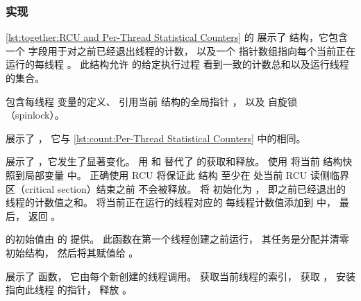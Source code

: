 \subsubsection{实现}

\begin{fcvref}
\cref{lst:together:RCU and Per-Thread Statistical Counters}
的 
展示了  结构，它包含一个
 字段用于对之前已经退出线程的计数，
以及一个  指针数组指向每个当前正在
运行的每线程 。
此结构允许  的给定执行过程
看到一致的计数总和以及运行线程的集合。

\begin{listing}
\caption{RCU 与每线程统计计数器}
\label{lst:together:RCU and Per-Thread Statistical Counters}
\end{listing}

包含每线程  变量的定义、
引用当前  结构的全局指针 ，
以及  自旋锁（spinlock）。

 展示了 ，
它与 \cref{lst:count:Per-Thread Statistical Counters} 中的相同。
\end{fcvref}

\begin{fcvref}
 展示了 ，它发生了显著变化。
 用  和
 替代了  的获取和释放。
 使用  将当前
 结构快照到局部变量  中。
正确使用 RCU 将保证此  结构
至少在  处当前 RCU 读侧临界区（critical section）结束之前
不会被释放。
 将  初始化为 ，
即之前已经退出的线程的计数值之和。
 将当前正在运行的线程对应的
每线程计数值添加到  中，
最后， 返回 。
\end{fcvref}

\begin{fcvref}
 的初始值由
 的  提供。
此函数在第一个线程创建之前运行，
其任务是分配并清零初始结构，
然后将其赋值给 。
\end{fcvref}

\begin{fcvref}
 展示了  函数，
它由每个新创建的线程调用。
 获取当前线程的索引，
 获取 ，
 安装指向此线程  的指针，
 释放 。
\end{fcvref}


